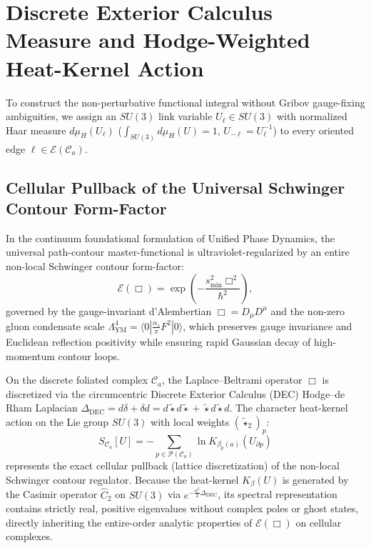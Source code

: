 \documentclass[11pt, a4paper]{article}
\theoremstyle{definition}
\theoremstyle{remark}
\begin{document}
\section{Discrete Exterior Calculus Measure and Hodge-Weighted Heat-Kernel Action}

To construct the non-perturbative functional integral without Gribov gauge-fixing ambiguities, we assign an $SU(3)$ link variable $U_{\ell} \in SU(3)$ with normalized Haar measure $d\mu_{H}(U_{\ell})$ ($\int_{SU(3)} d\mu_{H}(U) = 1$, $U_{-\ell} = U_{\ell}^{-1}$) to every oriented edge $\ell \in \mathcal{E}(\mathcal{C}_{a})$.

\subsection{Cellular Pullback of the Universal Schwinger Contour Form-Factor}

In the continuum foundational formulation of Unified Phase Dynamics, the universal path-contour master-functional is ultraviolet-regularized by an entire non-local Schwinger contour form-factor:
\begin{equation}
  \mathcal{E}(\Box) = \exp\!\left(-\frac{s_{\min}^{2}\Box^{2}}{\hbar^{2}}\right),
\end{equation}
governed by the gauge-invariant d'Alembertian $\Box = D_{\mu}D^{\mu}$ and the non-zero gluon condensate scale $\Lambda_{\mathrm{YM}}^{4} = \langle 0 | \frac{\alpha_{s}}{\pi}F^{2} | 0 \rangle$, which preserves gauge invariance and Euclidean reflection positivity while ensuring rapid Gaussian decay of high-momentum contour loops.

On the discrete foliated complex $\mathcal{C}_{a}$, the Laplace--Beltrami operator $\Box$ is discretized via the circumcentric Discrete Exterior Calculus (DEC) Hodge--de Rham Laplacian $\Delta_{\mathrm{DEC}} = d\delta + \delta d = d\tilde{\star}d\tilde{\star} + \tilde{\star}d\tilde{\star}d$. The character heat-kernel action on the Lie group $SU(3)$ with local weights $(\tilde{\star}_{2})_{p}$:
\begin{equation}
  S_{\mathcal{C}_{a}}[U] = -\sum_{p \in \mathcal{P}(\mathcal{C}_{a})} \ln K_{\beta_{p}(a)}(U_{\partial p})
\end{equation}
represents the exact cellular pullback (lattice discretization) of the non-local Schwinger contour regulator. Because the heat-kernel $K_{\beta}(U)$ is generated by the Casimir operator $\hat{C}_{2}$ on $SU(3)$ via $e^{-\frac{a^{2}}{2}\Delta_{\mathrm{DEC}}}$, its spectral representation contains strictly real, positive eigenvalues without complex poles or ghost states, directly inheriting the entire-order analytic properties of $\mathcal{E}(\Box)$ on cellular complexes.
\end{document}
